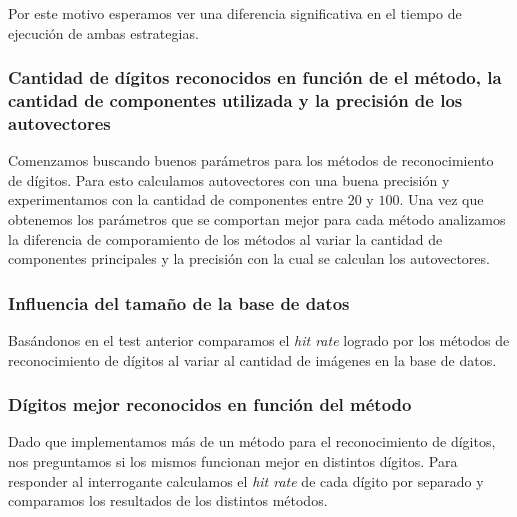 		Por este motivo esperamos ver una diferencia significativa en el tiempo de
		ejecuci\'on de ambas estrategias.

	\subsubsection{Cantidad de d\'igitos reconocidos en funci\'on de el m\'etodo,
	la cantidad de componentes utilizada y la precisi\'on de los autovectores}
		Comenzamos buscando buenos par\'ametros para los m\'etodos de reconocimiento
		de d\'igitos. Para esto calculamos autovectores con una buena precisi\'on
		y experimentamos con la cantidad de componentes entre $20$ y $100$.
		Una vez que obtenemos los par\'ametros que se comportan mejor para cada
		m\'etodo analizamos la diferencia de comporamiento de los m\'etodos
		al variar la cantidad de componentes principales y la precisi\'on con
		la cual se calculan los autovectores.

	\subsubsection{Influencia del tama\~no de la base de datos}
		Bas\'andonos en el test anterior comparamos el \textit{hit rate} logrado
		por los m\'etodos de reconocimiento de d\'igitos al variar al cantidad
		de im\'agenes en la base de datos.
		
	\subsubsection{D\'igitos mejor reconocidos en funci\'on del m\'etodo}
		Dado que implementamos m\'as de un m\'etodo para el reconocimiento de
		d\'igitos, nos preguntamos si los mismos funcionan mejor en distintos
		d\'igitos. Para responder al interrogante calculamos el \textit{hit rate}
		de cada d\'igito por separado y comparamos los resultados de los
		distintos m\'etodos.
